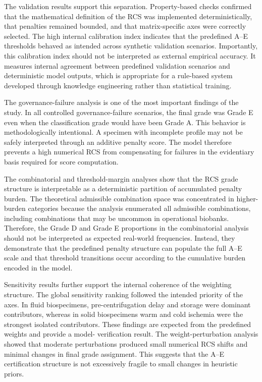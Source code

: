 \documentclass[preprint,12pt]{elsarticle}
\begin{document}
The validation results support this separation. Property-based checks confirmed that the mathematical definition of the RCS was implemented 
deterministically, that penalties remained bounded, and that matrix-specific axes were correctly selected. The high internal calibration index 
indicates that the predefined A--E thresholds behaved as intended across synthetic validation scenarios. Importantly, this calibration index should not be interpreted as external empirical accuracy. It measures internal agreement between predefined validation scenarios and deterministic model outputs, which is appropriate for a rule-based system developed through knowledge engineering rather than statistical training.

The governance-failure analysis is one of the most important findings of the study. In all controlled governance-failure scenarios, the final grade was Grade E even when the classification 
grade would have been Grade A. This behavior is methodologically intentional. A specimen with incomplete profile may not be safely interpreted through an additive penalty score. The model 
therefore prevents a high numerical RCS from compensating for failures in the evidentiary basis required for score computation.

The combinatorial and threshold-margin analyses show that the RCS grade structure is interpretable as a deterministic partition of accumulated 
penalty burden. The theoretical admissible combination space was concentrated in higher-burden categories because the analysis enumerated all 
admissible combinations, including combinations that may be uncommon in operational biobanks. Therefore, the Grade D and Grade E proportions 
in the combinatorial analysis should not be interpreted as expected real-world frequencies. Instead, they demonstrate that the predefined 
penalty structure can populate the full A--E scale and that threshold transitions occur according to the cumulative burden encoded in the 
model.

Sensitivity results further support the internal coherence of the weighting structure. The global sensitivity ranking followed the intended 
priority of the axes. In fluid biospecimens, pre-centrifugation delay and storage were dominant contributors, whereas in solid biospecimens 
warm and cold ischemia were the strongest isolated contributors. These findings are expected from the predefined weights and provide a model-
verification result. The weight-perturbation analysis showed that moderate perturbations produced small numerical RCS shifts and minimal 
changes in final grade assignment. This suggests that the A--E certification structure is not excessively fragile to small changes in 
heuristic priors.
\end{document}
